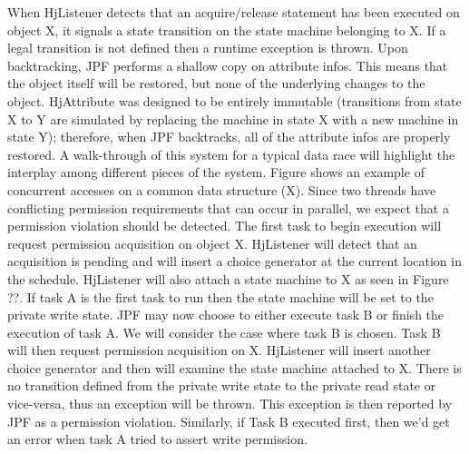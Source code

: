 When HjListener detects that an acquire/release statement has been executed on
object X, it signals a state transition on the state machine belonging to X. If
a legal transition is not defined then a runtime exception is thrown. Upon
backtracking, JPF performs a shallow copy on attribute infos. This means that
the object itself will be restored, but none of the underlying changes to the
object. HjAttribute was designed to be entirely immutable (transitions from
state X to Y are simulated by replacing the machine in state X with a new
machine in state Y); therefore, when JPF backtracks, all of the attribute infos
are properly restored.  A walk-through of this system for a typical data race
will highlight the interplay among different pieces of the system. Figure{}
shows an example of concurrent accesses on a common data structure (X). Since
two threads have conflicting permission requirements that can occur in parallel,
we expect that a permission violation should be detected.
The first task to begin execution will request permission acquisition on object
X. HjListener will detect that an acquisition is pending and will insert a
choice generator at the current location in the schedule. HjListener will also
attach a state machine to X as seen in Figure ??. If task A is the first task to
run then the state machine will be set to the private write state. JPF may now
choose to either execute task B or finish the execution of task A. We will
consider the case where task B is chosen. Task B will then request permission
acquisition on X. HjListener will insert another choice generator and then will
examine the state machine attached to X. There is no transition defined from the
private write state to the private read state or vice-versa, thus an exception
will be thrown. This exception is then reported by JPF as a permission
violation. Similarly, if Task B executed first, then we’d get an error when task
A tried to assert write permission.



